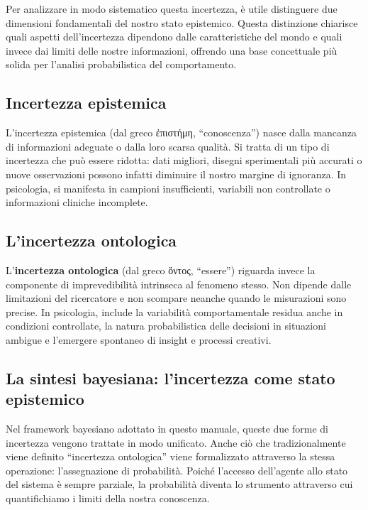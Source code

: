 \documentclass[
  letterpaper,
  DIV=11,
  numbers=noendperiod,
  oneside]{scrreprt}
\theoremstyle{definition}
\theoremstyle{plain}
\theoremstyle{definition}
\theoremstyle{remark}
\begin{document}
Per analizzare in modo sistematico questa incertezza, è utile
distinguere due dimensioni fondamentali del nostro stato epistemico.
Questa distinzione chiarisce quali aspetti dell'incertezza dipendono
dalle caratteristiche del mondo e quali invece dai limiti delle nostre
informazioni, offrendo una base concettuale più solida per l'analisi
probabilistica del comportamento.

\subsection{Incertezza epistemica}\label{incertezza-epistemica}

L'incertezza epistemica (dal greco ἐπιστήμη, ``conoscenza'') nasce dalla
mancanza di informazioni adeguate o dalla loro scarsa qualità. Si tratta
di un tipo di incertezza che può essere ridotta: dati migliori, disegni
sperimentali più accurati o nuove osservazioni possono infatti diminuire
il nostro margine di ignoranza. In psicologia, si manifesta in campioni
insufficienti, variabili non controllate o informazioni cliniche
incomplete.

\subsection{L'incertezza ontologica}\label{lincertezza-ontologica}

L'\textbf{incertezza ontologica} (dal greco ὄντος, ``essere'') riguarda
invece la componente di imprevedibilità intrinseca al fenomeno stesso.
Non dipende dalle limitazioni del ricercatore e non scompare neanche
quando le misurazioni sono precise. In psicologia, include la
variabilità comportamentale residua anche in condizioni controllate, la
natura probabilistica delle decisioni in situazioni ambigue e l'emergere
spontaneo di insight e processi creativi.

\subsection{La sintesi bayesiana: l'incertezza come stato
epistemico}\label{la-sintesi-bayesiana-lincertezza-come-stato-epistemico}

Nel framework bayesiano adottato in questo manuale, queste due forme di
incertezza vengono trattate in modo unificato. Anche ciò che
tradizionalmente viene definito ``incertezza ontologica'' viene
formalizzato attraverso la stessa operazione: l'assegnazione di
probabilità. Poiché l'accesso dell'agente allo stato del sistema è
sempre parziale, la probabilità diventa lo strumento attraverso cui
quantifichiamo i limiti della nostra conoscenza.
\end{document}
